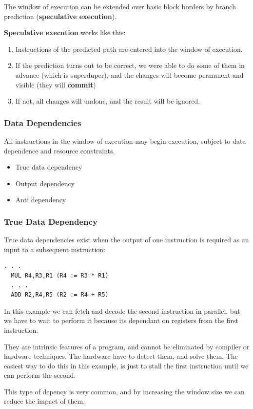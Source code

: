 The window of execution can be extended over basic block borders by branch prediction (\textbf{speculative execution}).

\textbf{Speculative execution} works like this:
\begin{enumerate}
\item Instructions of the predicted path are entered into the window of execution.
\item If the prediction turns out to be correct, we were able to do some of them in advance (which is superduper), and the changes will become permanent and visible (they will \textbf{commit})
\item If not, all changes will undone, and the result will be ignored.
\end{enumerate}

\subsubsection{Data Dependencies}
All instructions in the window of execution may begin execution, subject to data dependence and resource constraints.
\begin{itemize}
\item True data dependency
\item Output dependency
\item Anti dependency
\end{itemize}

\subsubsection{True Data Dependency}
True data dependencies exist when the output of one instruction is required as an input to a subsequent instruction:
\begin{lstlisting}[frame=single]  % Start your code-block
  . . .
  MUL R4,R3,R1 (R4 := R3 * R1)
  . . .
  ADD R2,R4,R5 (R2 := R4 + R5)
\end{lstlisting}
In this example we can fetch and decode the second instruction in parallel, but we have to wait to perform it because its dependant on registers from the first instruction.

They are intrinsic features of a program, and cannot be eliminated by compiler or hardware techniques. The hardware have to detect them, and solve them. The easiest way to do this in this example, is just to stall the first instruction until we can perform the second.

This type of depency is very common, and by increasing the window size we can reduce the impact of them. \\

